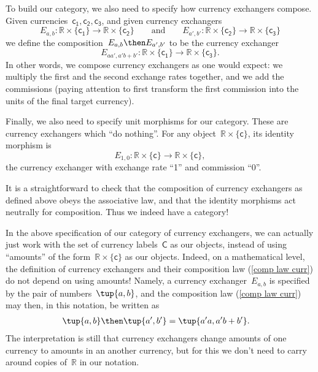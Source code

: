 To build our category, we also need to specify how currency exchangers compose. Given currencies~$\mathsf{c_1}, \mathsf{c_2}, \mathsf{c_3}$, and given currency exchangers
\begin{equation*}
E_{a,b} \colon \mathbb{R} \times \{\mathsf{c_1} \} \rightarrow \mathbb{R} \times \{ \mathsf{c_2}\}
\qquad \text{and} \qquad
E_{a',b'} \colon \mathbb{R} \times \{\mathsf{c_2}\} \rightarrow \mathbb{R} \times \{\mathsf{c_3}\}
\end{equation*}
we define the composition~$E_{a,b} \then E_{a',b'}$ to be the currency exchanger
\begin{equation}
\label{comp law curr}
E_{aa',a'b + b'} \colon \mathbb{R} \times \{\mathsf{c_1}\} \rightarrow \mathbb{R} \times \{\mathsf{c_3}\}.
\end{equation}
In other words, we compose currency exchangers as one would expect: we multiply the first and the second exchange rates together, and we add the commissions (paying attention to first transform the first commission into the units of the final target currency).

Finally, we also need to specify unit morphisms for our category. These are currency exchangers which ``do nothing''. For any object~$\mathbb{R} \times \{ \mathsf{c}\}$, its identity morphism is 
\begin{equation*}
E_{1,0} \colon \mathbb{R} \times \{\mathsf{c}\} \rightarrow \mathbb{R} \times \{\mathsf{c}\},
\end{equation*}
the currency exchanger with exchange rate ``1''  and commission ``0''. 

It is a straightforward to check that the composition of currency exchangers as defined above obeys the associative law, and that the identity morphisms act neutrally for composition. Thus we indeed have a category!

\begin{remark}
In the above specification of our category of currency exchangers, we can actually just work with the set of currency labels~$\mathsf{C}$ as our objects, instead of using ``amounts'' of the form~$\mathbb{R} \times \{\mathsf{c}\}$ as our objects. Indeed, on a mathematical level, the definition of currency exchangers and their composition law (\cref{comp law curr}) do not depend on using amounts! Namely, a currency exchanger~$E_{a,b}$ is specified by the pair of numbers~$\tup{a, b}$, and the composition law (\ref{comp law curr}) may then, in this notation, be written as 
\begin{equation}
\begin{aligned}
\label{eq:currencycomp}
    \tup{a,b}\then \tup{a',b'}&=\tup{a' a, a' b + b'}.
\end{aligned}
\end{equation}
The interpretation is still that currency exchangers change amounts of one currency to amounts in an another currency, but for this we don't need to carry around copies of~$\mathbb{R}$ in our notation.
\end{remark}

